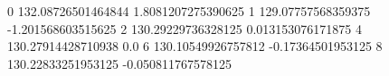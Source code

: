 0 132.08726501464844 1.8081207275390625
1 129.07757568359375 -1.201568603515625
2 130.29229736328125 0.013153076171875
4 130.27914428710938 0.0
6 130.10549926757812 -0.17364501953125
8 130.22833251953125 -0.050811767578125
